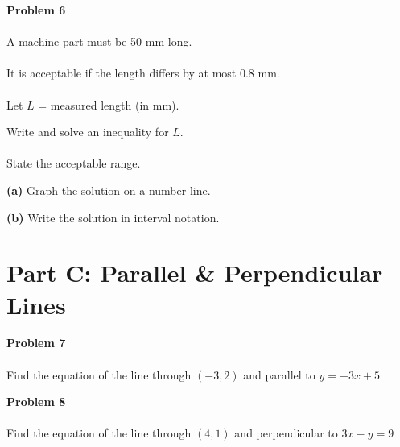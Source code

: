 \documentclass[12pt]{article}
\begin{document}
            \textbf{Problem 6}\\\\
            A machine part must be 50 mm long.\\\\
            It is acceptable if the length differs by at most 0.8 mm.\\\\
            Let $L$ = measured length (in mm).

            \vspace{0.5cm}

            Write and solve an inequality for $L$.\\\\
            State the acceptable range.

            \vspace{3cm}

            \textbf{(a)} Graph the solution on a number line.

            \vspace{0.5cm}

            \begin{center}
            \end{center}

            \vspace{0.5cm}

            \textbf{(b)} Write the solution in interval notation.

            \newpage

        \section*{Part C: Parallel \& Perpendicular Lines}

            \textbf{Problem 7}\\\\
            Find the equation of the line through $(-3, 2)$ and parallel to $y = -3x + 5$

            \vspace{4cm}

            \textbf{Problem 8}\\\\
            Find the equation of the line through $(4, 1)$ and perpendicular to $3x - y = 9$
\end{document}
